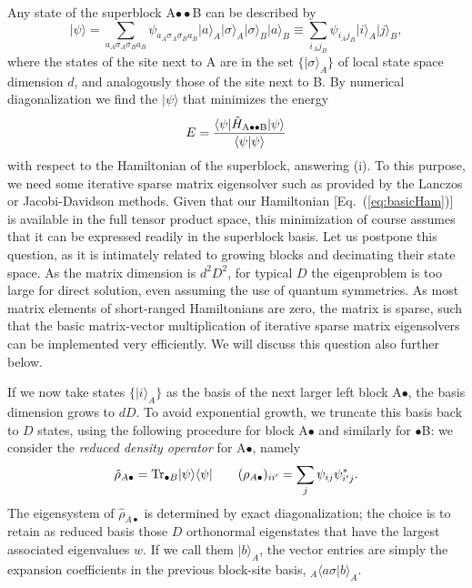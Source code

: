 \documentclass[a4paper,10pt,oneside,onecolumn,1p,times]{elsarticle}
\newcommand{\Tr}{{\rm Tr}}
\newcommand{\bra}[1]{\mbox{$\langle #1  |$}}
\newcommand{\ket}[1]{\mbox{$| #1  \rangle$}}
\newcommand{\braket}[2]{\mbox{$\langle #1  | #2 \rangle$}} 	%
\begin{document}
Any state of the superblock A$\bullet\bullet$B can be described by 
\begin{equation}
\ket{\psi}= \sum_{a_A \sigma_A \sigma_B a_B} \psi_{a_A \sigma_A \sigma_B a_B} \ket{a}_A \ket{\sigma}_A \ket{\sigma}_B \ket{a}_B \equiv \sum_{i_A j_B} \psi_{i_A j_B} \ket{i}_A \ket{j}_B,
\label{US:eq:DMRGstate}
\end{equation} 
where the states of the site next to A are in the set $\{ \ket{\sigma}_A \}$ of local state space dimension $d$, and analogously those of the site next to B. By numerical diagonalization we find the $\ket{\psi}$ that minimizes the energy
\begin{equation}
E = \frac{\bra{\psi} \hat{H}_{{\rm A}\bullet\bullet{\rm B}} \ket{\psi}}{\braket{\psi}{\psi}}
\end{equation}
with respect to the Hamiltonian of the superblock, answering (i). To this purpose, we need some iterative sparse matrix eigensolver such as provided by the Lanczos or Jacobi-Davidson methods. Given that our Hamiltonian [Eq.~(\ref{eq:basicHam})] is available in the full tensor product space, this minimization of course assumes that it can be expressed readily in the superblock basis. Let us postpone this question, as it is intimately related to growing blocks and decimating their state space. As the matrix dimension is $d^2 D^2$, for typical $D$ the eigenproblem is too large for direct solution, even assuming the use of quantum symmetries. As most matrix elements of short-ranged Hamiltonians are zero, the matrix is sparse, such that the basic matrix-vector multiplication of iterative sparse matrix eigensolvers can be implemented very efficiently. We will discuss this question also further below. 

If we now take states $\{ \ket{i}_A \}$ as the basis of the next larger left block A$\bullet$, the basis dimension grows to $dD$. To avoid exponential growth, we truncate this basis back to $D$ states, using the following procedure for block A$\bullet$ and similarly for $\bullet$B: we consider the {\em reduced density operator} for A$\bullet$, namely
\begin{equation}
\hat{\rho}_{A\bullet} = \Tr_{\bullet B} \ket{\psi}\bra{\psi} 	\quad\quad (\rho_{A\bullet})_{ii'} = \sum_j \psi_{ij}\psi^*_{i'j} .  
\end{equation}
The eigensystem of $\hat{\rho}_{A\bullet}$ is determined by exact diagonalization; the choice is to retain as reduced basis those $D$ orthonormal eigenstates that have the largest associated eigenvalues $w$. If we call them $\ket{b}_A$, the vector entries are simply the expansion coefficients in the previous block-site basis, $_A \braket{a \sigma}{b}_A$. 
\end{document}
